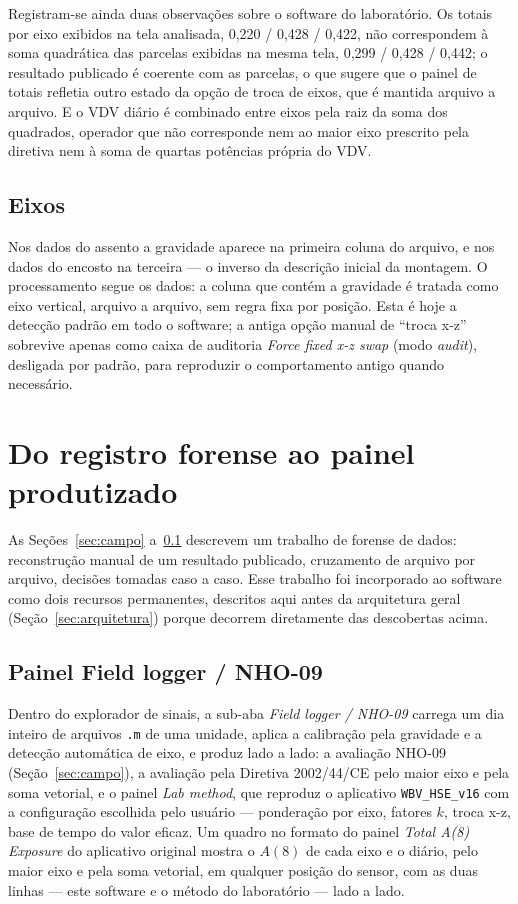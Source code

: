 \documentclass[11pt,a4paper]{article}
\newcommand{\code}[1]{\texttt{\small #1}}
\begin{document}
Registram-se ainda duas observações sobre o software do laboratório. Os totais
por eixo exibidos na tela analisada, 0,220 / 0,428 / 0,422, não correspondem à
soma quadrática das parcelas exibidas na mesma tela, 0,299 / 0,428 / 0,442; o
resultado publicado é coerente com as parcelas, o que sugere que o painel de
totais refletia outro estado da opção de troca de eixos, que é mantida arquivo
a arquivo. E o VDV diário é combinado entre eixos pela raiz da soma dos
quadrados, operador que não corresponde nem ao maior eixo prescrito pela
diretiva nem à soma de quartas potências própria do VDV.

\subsection{Eixos}
\label{sec:eixos}

Nos dados do assento a gravidade aparece na primeira coluna do arquivo, e nos
dados do encosto na terceira --- o inverso da descrição inicial da montagem. O
processamento segue os dados: a coluna que contém a gravidade é tratada como
eixo vertical, arquivo a arquivo, sem regra fixa por posição. Esta é hoje a
detecção padrão em todo o software; a antiga opção manual de ``troca x-z''
sobrevive apenas como caixa de auditoria \emph{Force fixed x-z swap} (modo
\emph{audit}), desligada por padrão, para reproduzir o comportamento antigo
quando necessário.

\section{Do registro forense ao painel produtizado}
\label{sec:fieldlogger}

As Seções~\ref{sec:campo} a~\ref{sec:eixos} descrevem um trabalho de forense de
dados: reconstrução manual de um resultado publicado, cruzamento de arquivo por
arquivo, decisões tomadas caso a caso. Esse trabalho foi incorporado ao
software como dois recursos permanentes, descritos aqui antes da arquitetura
geral (Seção~\ref{sec:arquitetura}) porque decorrem diretamente das descobertas
acima.

\subsection{Painel Field logger / NHO-09}

Dentro do explorador de sinais, a sub-aba \emph{Field logger / NHO-09} carrega
um dia inteiro de arquivos \code{.m} de uma unidade, aplica a calibração pela
gravidade e a detecção automática de eixo, e produz lado a lado: a avaliação
NHO-09 (Seção~\ref{sec:campo}), a avaliação pela Diretiva 2002/44/CE pelo maior
eixo e pela soma vetorial, e o painel \emph{Lab method}, que reproduz o
aplicativo \code{WBV\_HSE\_v16} com a configuração escolhida pelo usuário ---
ponderação por eixo, fatores $k$, troca x-z, base de tempo do valor eficaz.
Um quadro no formato do painel \emph{Total A(8) Exposure} do aplicativo original
mostra o $A(8)$ de cada eixo e o diário, pelo maior eixo e pela soma vetorial,
em qualquer posição do sensor, com as duas linhas --- este software e o método
do laboratório --- lado a lado.
\end{document}
